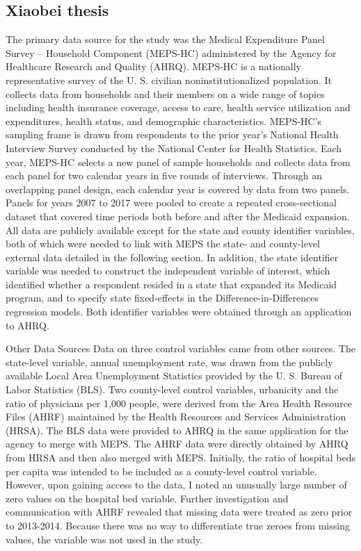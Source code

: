 \documentclass[../main.tex]{subfiles}
\begin{document}
\subsection{Xiaobei thesis }

The primary data source for the study was the Medical Expenditure Panel Survey – Household Component (MEPS-HC) administered by the Agency for Healthcare Research and Quality (AHRQ). MEPS-HC is a nationally representative survey of the U. S. civilian noninstitutionalized population. It collects data from households and their members on a wide range of topics including health insurance coverage, access to care, health service utilization and expenditures, health status, and demographic characteristics. MEPS-HC’s sampling frame is drawn from respondents to the prior year’s National Health Interview Survey conducted by the National Center for Health Statistics. Each year, MEPS-HC selects a new panel of sample households and collects data from each panel for two calendar years in five rounds of interviews. Through an overlapping panel design, each calendar year is covered by data from two panels. Panels for years 2007 to 2017 were pooled to create a repeated cross-sectional dataset that covered time periods both before and after the Medicaid expansion. All data are publicly available except for the state and county identifier variables, both of which were needed to link with MEPS the state- and county-level external data detailed in the following section. In addition, the state identifier variable was needed to construct the independent variable of interest, which identified whether a respondent resided in a state that expanded its Medicaid program, and to specify state fixed-effects in the Difference-in-Differences regression models. Both identifier variables were obtained through an application to AHRQ.


Other Data Sources Data on three control variables came from other sources. The state-level variable, annual unemployment rate, was drawn from the publicly available Local Area Unemployment Statistics provided by the U. S. Bureau of Labor Statistics (BLS). Two county-level control variables, urbanicity and the ratio of physicians per 1,000 people, were derived from the Area Health Resource Files (AHRF) maintained by the Health Resources and Services Administration (HRSA). The BLS data were provided to AHRQ in the same application for the agency to merge with MEPS. The AHRF data were directly obtained by AHRQ from HRSA and then also merged with MEPS. Initially, the ratio of hospital beds per capita was intended to be included as a county-level control variable. However, upon gaining access to the data, I noted an unusually large number of zero values on the hospital bed variable. Further investigation and communication with AHRF revealed that missing data were treated as zero prior to 2013-2014. Because there was no way to differentiate true zeroes from missing values, the variable was not used in the study.
\end{document}
